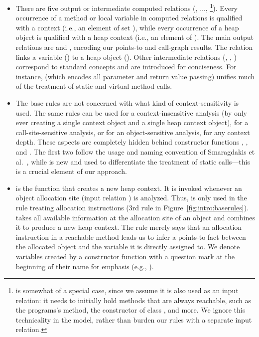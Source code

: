 \begin{itemize}
\item There are five output or intermediate computed relations (, $\ldots$, \footnote{ is somewhat of a special case, since we assume it is also used as an input relation: it needs to initially hold methods that are always reachable, such as the programs's  method, the constructor of class , and more. We ignore this technicality in the model, rather than burden our rules with a separate input relation.}). Every occurrence of a method or local variable in computed relations is qualified with a context (i.e., an element of set ), while every occurrence of a heap object is qualified with a heap context (i.e., an element of ). The main output relations are  and \relname{}, encoding our points-to and call-graph results. The  relation links a variable () to a heap object (). Other intermediate relations (, , ) correspond to standard concepts and are introduced for conciseness. For instance,  (which encodes all parameter and return value passing) unifies much of the treatment of static and virtual method calls.

\item The base rules are not concerned with what kind of context-sensitivity is used. The same rules can be used for a context-insensitive analysis (by only ever creating a single context object and a single heap context object), for a call-site-sensitive analysis, or for an object-sensitive analysis, for any context depth. These aspects are completely hidden behind constructor functions , , and . The first two follow the usage and naming convention of Smaragdakis et al.~\cite{popl:2011:Smaragdakis}, while  is new and used to differentiate the treatment of static calls---this is a crucial element of our approach.

\item {} is the function that creates a new heap context. It is invoked whenever an object allocation site (input relation ) is analyzed. Thus,  is only used in the rule treating allocation instructions (3rd rule in Figure~\ref{fig:intro:baserules}).  takes all available information at the allocation site of an object and combines it to produce a new heap context. The rule merely says that an allocation instruction in a reachable method leads us to infer a points-to fact between the allocated object and the variable it is directly assigned to. We denote variables created by a constructor function with a question mark at the beginning of their name for emphasis (e.g., ).


\end{itemize}
